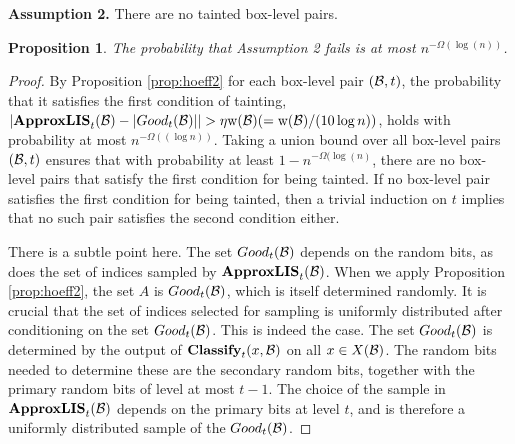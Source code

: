 \documentclass{acmsmall}
\newtheorem{prop}[theorem]{Proposition}
\newcommand{\cB}{{\cal B}}
\newcommand{\lis}{{\tt lis}}
\newcommand{\taint}{\eta}
\newcommand{\width}{{\bf {\rm  w}}}
\newcommand{\classify}{{\rm {\bf Classify}}}
\newcommand{\approxlis}{{\rm {\bf ApproxLIS}}}
\newcommand{\findsplitter}{{\rm {\bf FindSplitter}}}
\newcommand{\buildgrid}{{\rm {\bf BuildGrid}}}
\begin{document}
\smallskip
\noindent
{\bf Assumption 2.}  There are no tainted box-level pairs. 


\begin{prop}
\label{prop:assumption 2}
The probability that Assumption 2 fails   is at most  $n^{-\Omega(\log(n))}$.  
\end{prop}

\begin{proof}
By Proposition \ref{prop:hoeff2} for each box-level pair $(\cB,t)$,  the probability that it satisfies the first condition of tainting, $|\approxlis_t(\cB)  - |Good_t(\cB)|| > \taint \width(\cB) (= \width(\cB)/(10\log n))$,
holds with probability at most $n^{-\Omega((\log n))}$. Taking a union bound over all box-level  pairs $(\cB,t)$ ensures that with probability
at least $1-n^{-\Omega(\log(n)}$, there are no box-level pairs that satisfy the first condition for being tainted.  If no box-level pair satisfies the first condition 
for being tainted, then a trivial induction on $t$ implies
that  no such pair satisfies the second condition either.

There is a subtle point here.   The set $Good_t(\cB)$ depends on the random bits, as does the set of indices
sampled by $\approxlis_t(\cB)$. When we apply Proposition \ref{prop:hoeff2}, the set $A$ is $Good_t(\cB)$, which
is itself determined randomly.  It is crucial that the
set of indices selected for sampling is uniformly distributed after conditioning on the 
set $Good_t(\cB)$. This is indeed the case.  The set
$Good_t(\cB)$ is determined by the output of $\classify_t(x,\cB)$ on all $x \in X(\cB)$.  The random bits needed to determine
these are the secondary random bits, together with the primary random bits of level at most $t-1$.    
The choice of the sample in $\approxlis_t(\cB)$ depends on the primary bits at level $t$, and is therefore
a uniformly distributed sample of the $Good_t(\cB)$.
\end{proof}

%
\end{document}
